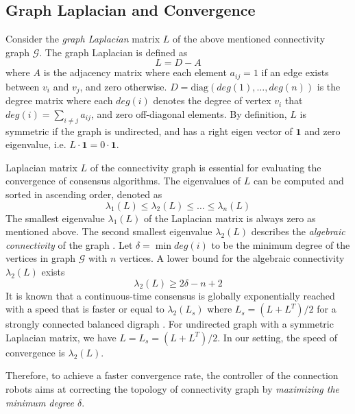 \documentclass[../main.tex]{subfiles}
\begin{document}
\subsection{Graph Laplacian and Convergence} \label{sec:laplacian}
Consider the \textit{graph Laplacian} matrix $L$ of the above mentioned connectivity graph $\mathcal{G}$. The graph Laplacian is defined as 
\begin{equation}\label{eq:laplacian} 
L = D - A
\end{equation}
where $A$ is the adjacency matrix where each element $a_{ij}=1$ if an edge exists between $v_i$ and $v_j$, and zero otherwise. $D = \text{diag}(deg(1), \ldots, deg(n))$ is the degree matrix where each $deg(i)$ denotes the degree of vertex $v_i$ that $deg(i) = \sum_{i \neq j} a_{ij}$, and zero off-diagonal elements. By definition, $L$ is symmetric if the graph is undirected, and has a right eigen vector of $\mathbf{1}$ and zero eigenvalue, i.e. $L \cdot \mathbf{1} = 0 \cdot \mathbf{1}$.

Laplacian matrix $L$ of the connectivity graph is essential for evaluating the convergence of consensus algorithms. The eigenvalues of $L$ can be computed and sorted in ascending order, denoted as
\begin{equation} 
    \lambda_1(L) \leq \lambda_2(L) \leq \ldots \leq \lambda_n(L)
\end{equation}
The smallest eigenvalue $\lambda_1(L)$ of the Laplacian matrix is always zero as mentioned above. The second smallest eigenvalue $\lambda_2(L)$ describes the \textit{algebraic connectivity} of the graph \cite{fiedler1973algebraic}. Let $\delta = \min deg(i)$ to be the minimum degree of the vertices in graph $\mathcal{G}$ with $n$ vertices. A lower bound for the algebraic connectivity $\lambda_2(L)$ exists \cite{de2007old}
\begin{equation}\label{eq:lambda_bound} 
\lambda_2(L) \geq 2 \delta - n + 2
\end{equation}
It is known that a continuous-time consensus is globally exponentially reached with a speed that is faster or equal to $\lambda_2(L_s)$ where $L_s = (L + L^T)/2$ for a strongly connected balanced digraph \cite{olfati2007consensus}. For undirected graph with a symmetric Laplacian matrix, we have $L = L_s = (L + L^T)/2$. In our setting, the speed of convergence is $\lambda_2(L)$. 

Therefore, to achieve a faster convergence rate, the controller of the connection robots aims at correcting the topology of connectivity graph by  \textit{maximizing the minimum degree $\delta$}.
\end{document}
